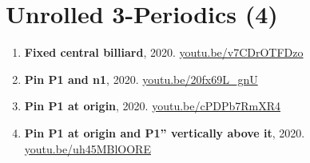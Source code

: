 \documentclass[12pt]{article}
\begin{document}
\section{Unrolled 3-Periodics (4)}

\begin{enumerate}[resume]
\item \textbf{Fixed central billiard}, 2020. \href{https://youtu.be/v7CDrOTFDzo}{\url{youtu.be/v7CDrOTFDzo}}
\item \textbf{Pin P1 and n1}, 2020. \href{https://youtu.be/20fx69L_gnU}{\url{youtu.be/20fx69L\_gnU}}
\item \textbf{Pin P1 at origin}, 2020. \href{https://youtu.be/cPDPb7RmXR4}{\url{youtu.be/cPDPb7RmXR4}}
\item \textbf{Pin P1 at origin and P1'' vertically above it}, 2020. \href{https://youtu.be/uh45MBlOORE}{\url{youtu.be/uh45MBlOORE}}
\end{enumerate}
\end{document}

